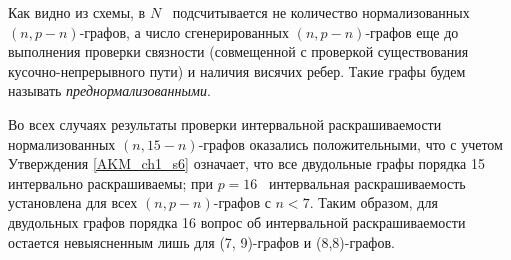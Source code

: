 Как видно из схемы, в  $N$ \ подсчитывается не количество нормализованных  $(n,p-n)${}-графов, а число сгенерированных
$(n,p-n)${}-графов еще до выполнения проверки связности (совмещенной с проверкой существования кусочно-непрерывного
пути) и наличия висячих ребер. Такие графы будем называть \textit{преднормализованными}.

Во всех случаях результаты проверки интервальной раскрашиваемости нормализованных  $(n,15-n)${}-графов оказались
положительными, что с учетом Утверждения \ref{AKM_ch1_s6} означает, что все двудольные графы порядка 15 интервально раскрашиваемы; при
$p=16$ \ интервальная раскрашиваемость установлена для всех  $(n,p-n)${}-графов с  $n<7$. Таким образом, для
двудольных графов порядка 16 вопрос об интервальной раскрашиваемости остается невыясненным лишь для (7, 9)-графов и
(8,8)-графов.

